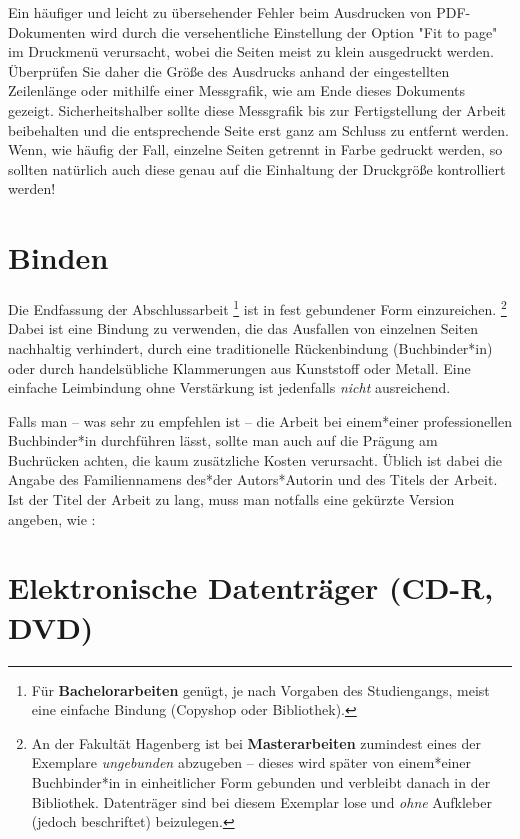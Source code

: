 Ein häufiger und leicht zu übersehender Fehler beim Ausdrucken von
PDF-Doku\-menten wird durch die versehentliche Einstellung der Option "Fit to
page" im Druckmenü verursacht, wobei die Seiten meist zu klein ausgedruckt
werden. Überprüfen Sie daher die Größe des Ausdrucks anhand der eingestellten
Zeilenlänge oder mithilfe einer Messgrafik, wie am Ende dieses Dokuments
gezeigt. Sicherheitshalber sollte diese Messgrafik bis zur Fertigstellung der
Arbeit beibehalten und die entsprechende Seite erst ganz am Schluss zu
entfernt werden. Wenn, wie häufig der Fall, einzelne Seiten getrennt in Farbe
gedruckt werden, so sollten natürlich auch diese genau auf die Einhaltung der
Druckgröße kontrolliert werden!


\section{Binden}

Die Endfassung der Abschlussarbeit%
\footnote{Für \textbf{Bachelorarbeiten} genügt, je nach Vorgaben des
Studiengangs, meist eine einfache Bindung (Copyshop oder Bibliothek).}
ist in fest gebundener Form einzureichen.%
\footnote{An der Fakultät Hagenberg ist bei \textbf{Masterarbeiten} zumindest
eines der Exemplare \emph{ungebunden} abzugeben -- dieses wird später von
einem*einer Buchbinder*in in einheitlicher Form gebunden und verbleibt danach
in der Bibliothek. Datenträger sind bei diesem Exemplar lose und \emph{ohne}
Aufkleber (jedoch beschriftet) beizulegen.}
Dabei ist eine Bindung zu verwenden, die das Ausfallen von einzelnen Seiten
nachhaltig verhindert, \zB durch eine traditionelle Rückenbindung
(Buchbinder*in) oder durch handelsübliche Klammerungen aus Kunststoff oder
Metall. Eine einfache Leimbindung ohne Verstärkung ist jedenfalls
\emph{nicht} ausreichend.

Falls man -- was sehr zu empfehlen ist -- die Arbeit bei einem*einer
professionellen Buchbinder*in durchführen lässt, sollte man auch auf die
Prägung am Buchrücken achten, die kaum zusätzliche Kosten verursacht. Üblich
ist dabei die Angabe des Familiennamens des*der Autors*Autorin und des Titels
der Arbeit. Ist der Titel der Arbeit zu lang, muss man notfalls eine gekürzte
Version angeben, wie \zB:
%
\begin{center}
	\setlength{\fboxsep}{3mm}
\end{center}


\section{Elektronische Datenträger (CD-R, DVD)}

